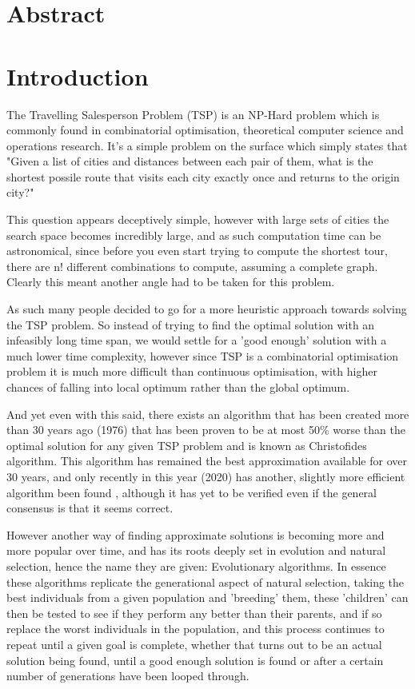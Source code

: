 \documentclass[11pt,a4paper,titlepage]{article}
\author{Alex Campbell}
\date{}
\begin{document}
\setlength{\parindent}{0em}
\setlength{\parskip}{1em}

\section*{Abstract}

\pagebreak
\tableofcontents
\pagebreak

\section{Introduction}
The Travelling Salesperson Problem (TSP) is an NP-Hard problem which is commonly found in combinatorial optimisation, theoretical computer science and operations research. It's a simple problem on the surface which simply states that "Given a list of cities and distances between each pair of them, what is the shortest possile route that visits each city exactly once and returns to the origin city?" \cite{TSPWiki}

This question appears deceptively simple, however with large sets of cities the search space becomes incredibly large, and as such computation time can be astronomical, since before you even start trying to compute the shortest tour, there are n! different combinations to compute, assuming a complete graph. Clearly this meant another angle had to be taken for this problem.

As such many people decided to go for a more heuristic approach towards solving the TSP problem. So instead of trying to find the optimal solution with an infeasibly long time span, we would settle for a 'good enough' solution with a much lower time complexity, however since TSP is a combinatorial optimisation problem it is much more difficult than continuous optimisation, with higher chances of falling into local optimum rather than the global optimum.

And yet even with this said, there exists an algorithm that has been created more than 30 years ago (1976) that has been proven to be at most 50\% worse than the optimal solution for any given TSP problem and is known as Christofides algorithm. This algorithm has remained the best approximation available for over 30 years, and only recently in this year (2020) has another, slightly more efficient algorithm been found \cite{TSP2020}, although it has yet to be verified even if the general consensus is that it seems correct.

However another way of finding approximate solutions is becoming more and more popular over time, and has its roots deeply set in evolution and natural selection, hence the name they are given: Evolutionary algorithms. In essence these algorithms replicate the generational aspect of natural selection, taking the best individuals from a given population and 'breeding' them, these 'children' can then be tested to see if they perform any better than their parents, and if so replace the worst individuals in the population, and this process continues to repeat until a given goal is complete, whether that turns out to be an actual solution being found, until a good enough solution is found or after a certain number of generations have been looped through.
\end{document}
